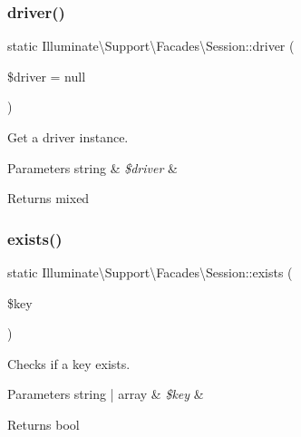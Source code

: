 \subsubsection{\texorpdfstring{driver()}{driver()}}
{\footnotesize\ttfamily static Illuminate\textbackslash{}\+Support\textbackslash{}\+Facades\textbackslash{}\+Session\+::driver (\begin{DoxyParamCaption}\item[{}]{\$driver = {\ttfamily null} }\end{DoxyParamCaption})\hspace{0.3cm}{\ttfamily [static]}}

Get a driver instance.


\begin{DoxyParams}[1]{Parameters}
string & {\em \$driver} & \\
\hline
\end{DoxyParams}
\begin{DoxyReturn}{Returns}
mixed 
\end{DoxyReturn}
\mbox{\label{class_illuminate_1_1_support_1_1_facades_1_1_session_a62f023cf1d39c1e67e5cb6094c7f94c6}} 
\subsubsection{\texorpdfstring{exists()}{exists()}}
{\footnotesize\ttfamily static Illuminate\textbackslash{}\+Support\textbackslash{}\+Facades\textbackslash{}\+Session\+::exists (\begin{DoxyParamCaption}\item[{}]{\$key }\end{DoxyParamCaption})\hspace{0.3cm}{\ttfamily [static]}}

Checks if a key exists.


\begin{DoxyParams}[1]{Parameters}
string | array & {\em \$key} & \\
\hline
\end{DoxyParams}
\begin{DoxyReturn}{Returns}
bool 
\end{DoxyReturn}
\mbox{\label{class_illuminate_1_1_support_1_1_facades_1_1_session_a3a230d00cf6c47f41e1c825b40219388}} 
